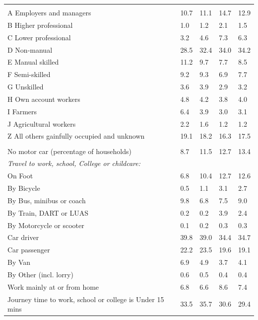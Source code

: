 \documentclass{article}
\begin{document}
\begin{table}[h]
\begin{tabular}{KTTTT}
\hline
    \\ 
    \hline
A Employers and managers & 10.7& 11.1& 14.7& 12.9\\
B Higher professional & 1.0& 1.2& 2.1& 1.5\\
C Lower professional & 3.2& 4.6& 7.3& 6.3\\
D Non-manual & 28.5& 32.4& 34.0& 34.2\\
E Manual skilled & 11.2&  9.7&  7.7&  8.5\\
F Semi-skilled & 9.2& 9.3& 6.9& 7.7\\
G Unskilled & 3.6& 3.9& 2.9& 3.2\\
H Own account workers & 4.8& 4.2& 3.8& 4.0\\
I Farmers & 6.4& 3.9& 3.0& 3.1\\
J Agricultural workers & 2.2& 1.6& 1.2& 1.2\\
Z All others gainfully occupied and unknown & 19.1& 18.2& 16.3& 17.5\\
\hline
{}\hline
    \\ 
    \hline
No motor car (percentage of households) &  8.7& 11.5& 12.7& 
13.4\\
    \hline 
\emph{Travel to work, school, College or childcare:} & & & \\
\quad On Foot &  6.8& 10.4& 12.7& 12.6\\ 
\quad By Bicycle & 0.5& 1.1& 3.1& 2.7\\ 
\quad By Bus, minibus or coach & 9.8& 6.8& 7.5& 9.0\\
\quad By Train, DART or LUAS & 0.2& 0.2& 3.9& 2.4\\
\quad By Motorcycle or scooter & 0.1& 0.2& 0.3& 0.3\\
\quad Car driver & 39.8 & 39.0& 34.4& 34.7\\
\quad Car passenger & 22.2& 23.5& 19.6& 19.1\\
\quad By Van & 6.9& 4.9& 3.7& 4.1\\
\quad By Other (incl. lorry) & 0.6& 0.5& 0.4& 0.4\\
    \hline
Work mainly at or from home & 6.8& 6.6& 8.6& 7.4\\
Journey time to work, school or college is Under 15 mins & 33.5& 35.7& 30.6& 29.4\\

\end{tabular}
\end{table}
\end{document}
